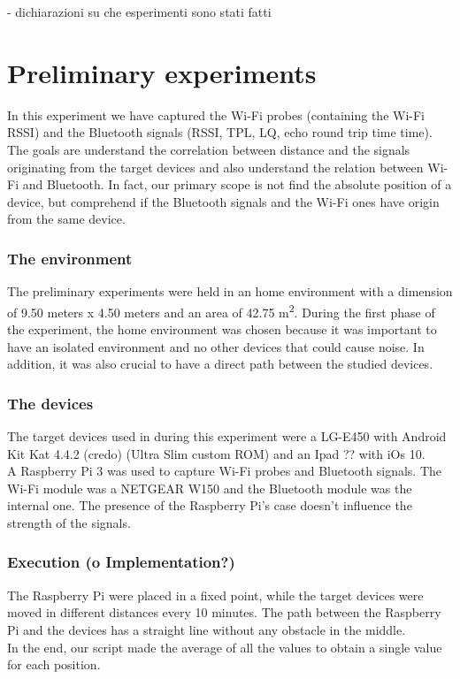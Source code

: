 - dichiarazioni su che esperimenti sono stati fatti\\
\section{Preliminary experiments}
In this experiment we have captured the Wi-Fi probes (containing the Wi-Fi RSSI) and the Bluetooth signals (RSSI, TPL, LQ, echo round trip time time).\\
The goals are understand the correlation between distance and the signals originating from the target devices and also understand the relation between Wi-Fi and Bluetooth. In fact, our primary scope is not find the absolute position of a device, but comprehend if the Bluetooth signals and the Wi-Fi ones have origin from the same device. 
\subsubsection{The environment}
The preliminary experiments were held in an home environment with a dimension of 9.50 meters x 4.50 meters and an area of 42.75 m\textsuperscript{2}.
During the first phase of the experiment, the home environment was chosen because it was important to have an isolated environment and no other devices that could cause noise. In addition, it was also crucial to have a direct path between the studied devices.\\
\subsubsection{The devices}
The target devices used in during this experiment were a LG-E450 with Android Kit Kat 4.4.2 (credo) (Ultra Slim custom ROM) and an Ipad ?? with iOs 10. \\
\linebreak
A Raspberry Pi 3 was used to capture Wi-Fi probes and Bluetooth signals. The Wi-Fi module was a NETGEAR W150 and the Bluetooth module was the internal one. The presence of the Raspberry Pi's case doesn't influence the strength of the signals.
\subsubsection{Execution (o Implementation?)}
The Raspberry Pi were placed in a fixed point, while the target devices were moved in different distances every 10 minutes. The path between the Raspberry Pi and the devices has a straight line without any obstacle in the middle.\\
In the end, our script made the average of all the values to obtain a single value for each position.
